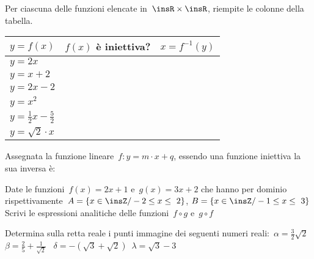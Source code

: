 \begin{esercizio}
 \label{ese:D.12}
Per ciascuna delle funzioni elencate in~$\insR \times\insR$, riempite le colonne 
della tabella.
\begin{center}
\begin{tabular}{l*2{c}}
\toprule
$y=f(x)$ & $f(x)$ è iniettiva? & $x=f^{-1}(y)$\\
\midrule
$y=2x$ & & \\
$y=x+2$ & & \\
$y=2x-2$ & & \\
$y=x^{2}$ & & \\
$y=\frac{1}{2}x-\frac{5}{2}$ & & \\
$y=\sqrt{2}\cdot x$ & & \\
\bottomrule
\end{tabular}
\end{center}
\end{esercizio}

\begin{esercizio}
 \label{ese:D.13}
Assegnata la funzione lineare~$f:y=m\cdot x+q$, essendo una funzione
iniettiva la sua inversa è:\dotfill
\end{esercizio}

\begin{esercizio}
 \label{ese:D.14}
Date le funzioni~$f(x)=2x+1$ e~$g(x)=3x+2$ che hanno per dominio
rispettivamente~$A=\left\{x\in \insZ/-2\le x\le~2\right\}$,
$B=\left\{x\in \insZ\text{/}-1\le x\le~3\right\}$
Scrivi le espressioni analitiche delle funzioni~$f\circ g$ e~$g\circ f$
\end{esercizio}


\begin{esercizio}
\label{ese:D.15}
Determina sulla retta reale i punti immagine dei seguenti numeri reali:~$\alpha 
=\frac{3}{2}\sqrt{2}$\, $\beta =\frac{2}{5}+\frac{1}{\sqrt{2}}$
\, $\delta =-\left(\sqrt{3}+\sqrt{2}\right)$\, $\lambda =\sqrt{3}-3$
\end{esercizio}


